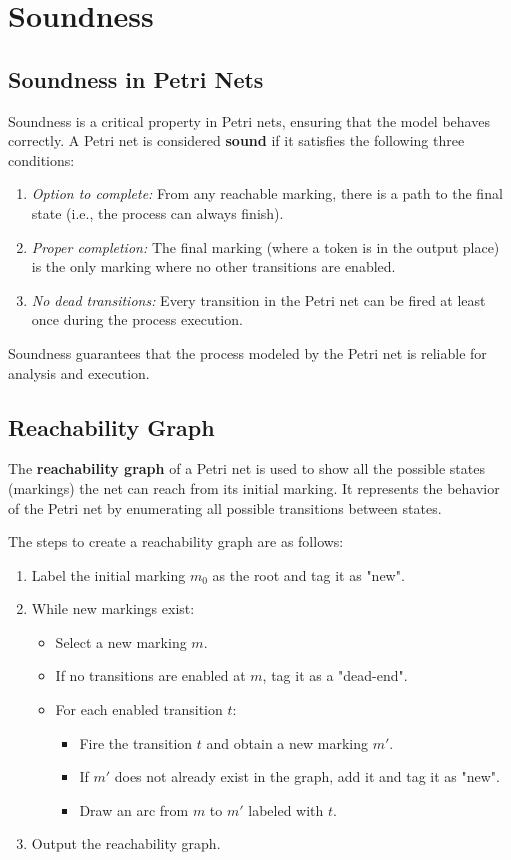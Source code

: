 \chapter{Soundness}
    \section{Soundness in Petri Nets}
    Soundness is a critical property in Petri nets, ensuring that the model behaves correctly. A Petri net is considered \textbf{sound} if it satisfies the following three conditions:
    \begin{enumerate}
        \item \textit{Option to complete:} From any reachable marking, there is a path to the final state (i.e., the process can always finish).
        \item \textit{Proper completion:} The final marking (where a token is in the output place) is the only marking where no other transitions are enabled.
        \item \textit{No dead transitions:} Every transition in the Petri net can be fired at least once during the process execution.
    \end{enumerate}
    Soundness guarantees that the process modeled by the Petri net is reliable for analysis and execution.
    
    \section{Reachability Graph}
    The \textbf{reachability graph} of a Petri net is used to show all the possible states (markings) the net can reach from its initial marking. It represents the behavior of the Petri net by enumerating all possible transitions between states.
    
    The steps to create a reachability graph are as follows:
    \begin{enumerate}
        \item Label the initial marking $m_0$ as the root and tag it as "new".
        \item While new markings exist:
        \begin{itemize}
            \item Select a new marking $m$.
            \item If no transitions are enabled at $m$, tag it as a "dead-end".
            \item For each enabled transition $t$:
            \begin{itemize}
                \item Fire the transition $t$ and obtain a new marking $m'$.
                \item If $m'$ does not already exist in the graph, add it and tag it as "new".
                \item Draw an arc from $m$ to $m'$ labeled with $t$.
            \end{itemize}
        \end{itemize}
        \item Output the reachability graph.
    \end{enumerate}
    
